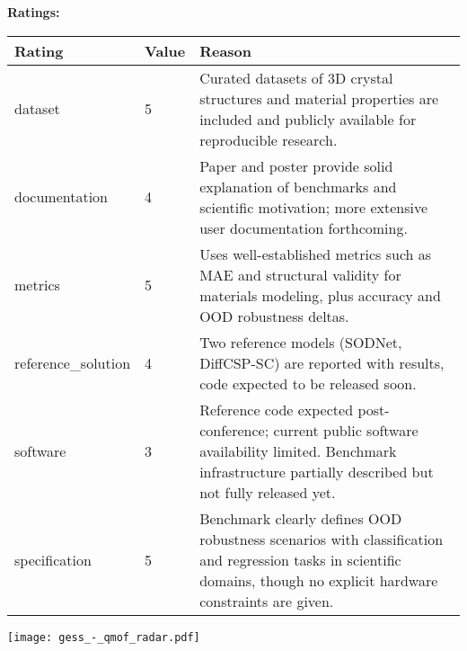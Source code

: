 {{{\bf Ratings:} ~ \\

\begin{tabular}{p{} p{} p{}}
\hline
Rating & Value & Reason \\
\hline
dataset & 5 & Curated datasets of 3D crystal structures and material properties are included and
publicly available for reproducible research.
 \\
documentation & 4 & Paper and poster provide solid explanation of benchmarks and scientific motivation;
more extensive user documentation forthcoming.
 \\
metrics & 5 & Uses well-established metrics such as MAE and structural validity for materials modeling,
plus accuracy and OOD robustness deltas.
 \\
reference\_solution & 4 & Two reference models (SODNet, DiffCSP-SC) are reported with results, code expected
to be released soon.
 \\
software & 3 & Reference code expected post-conference; current public software availability limited.
Benchmark infrastructure partially described but not fully released yet.
 \\
specification & 5 & Benchmark clearly defines OOD robustness scenarios with classification and regression
tasks in scientific domains, though no explicit hardware constraints are given.
 \\
\hline
\end{tabular}

\texttt{[image: gess\_-\_qmof\_radar.pdf]}
}}
\clearpage